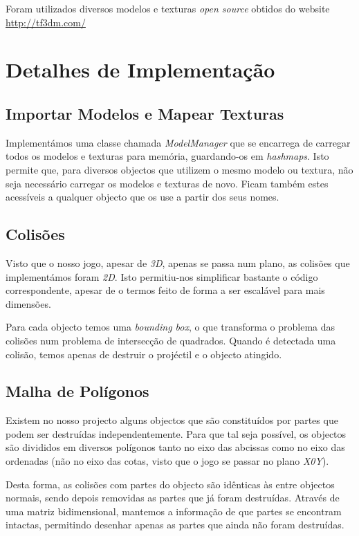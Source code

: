 \documentclass{article}
\begin{document}
 Foram utilizados diversos modelos e texturas \textit{open source} obtidos do website \url{http://tf3dm.com/}

\newpage
\section{Detalhes de Implementação}
 \subsection{Importar Modelos e Mapear Texturas}
  Implementámos uma classe chamada \textit{ModelManager} que se encarrega de carregar todos os modelos e texturas para memória, guardando-os em \textit{hashmaps}. Isto permite que, para diversos objectos que utilizem o mesmo modelo ou textura, não seja necessário carregar os modelos e texturas de novo. Ficam também estes acessíveis a qualquer objecto que os use a partir dos seus nomes.
 
 \subsection{Colisões}
  Visto que o nosso jogo, apesar de \textit{3D}, apenas se passa num plano, as colisões que implementámos foram \textit{2D}. Isto permitiu-nos simplificar bastante o código correspondente, apesar de o termos feito de forma a ser escalável para mais dimensões.
  
  Para cada objecto temos uma \textit{bounding box}, o que transforma o problema das colisões num problema de intersecção de quadrados. Quando é detectada uma colisão, temos apenas de destruir o projéctil e o objecto atingido.
 
 \subsection{Malha de Polígonos}
  Existem no nosso projecto alguns objectos que são constituídos por partes que podem ser destruídas independentemente. Para que tal seja possível, os objectos são divididos em diversos polígonos tanto no eixo das abcissas como no eixo das ordenadas (não no eixo das cotas, visto que o jogo se passar no plano \textit{X0Y}).
  
  Desta forma, as colisões com partes do objecto são idênticas às entre objectos normais, sendo depois removidas as partes que já foram destruídas. Através de uma matriz bidimensional, mantemos a informação de que partes se encontram intactas, permitindo desenhar apenas as partes que ainda não foram destruídas.
  
\end{document}
